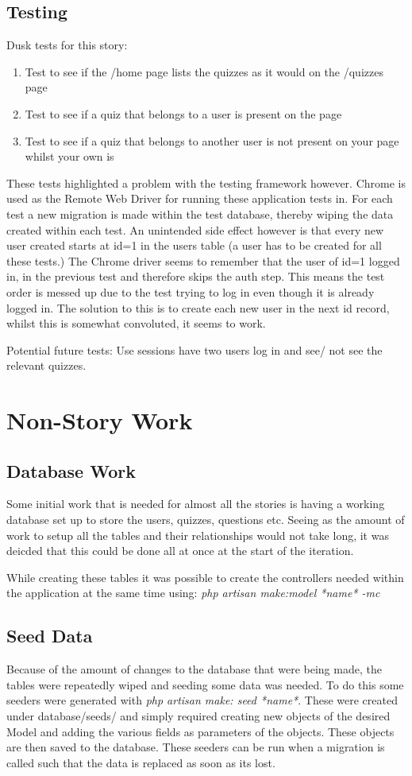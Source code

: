\documentclass{article}
\begin{document}
\subsection{Testing}
Dusk tests for this story:
\begin{enumerate}
	\item Test to see if the /home page lists the quizzes as it would on the /quizzes page
	\item Test to see if a quiz that belongs to a user is present on the page
	\item Test to see if a quiz that belongs to another user is not present on your page whilst your own is
\end{enumerate}
These tests highlighted a problem with the testing framework however. Chrome is used as the Remote Web Driver for running these application tests in. For each test a new migration is made within the test database, thereby wiping the data created within each test. An unintended side effect however is that every new user created starts at id=1 in the users table (a user has to be created for all these tests.) The Chrome driver seems to remember that the user of id=1 logged in, in the previous test and therefore skips the auth step. This means the test order is messed up due to the test trying to log in even though it is already logged in. The solution to this is to create each new user in the next id record, whilst this is somewhat convoluted, it seems to work.

Potential future tests: Use sessions have two users log in and see/ not see the relevant quizzes.
\newpage

\section{Non-Story Work}
\subsection{Database Work}
Some initial work that is needed for almost all the stories is having a working database set up to store the users, quizzes, questions etc. Seeing as the amount of work to setup all the tables and their relationships would not take long, it was deicded that this could be done all at once at the start of the iteration.

While creating these tables it was possible to create the controllers needed within the application at the same time using: \textit{php artisan make:model *name* -mc } 
\subsection{Seed Data}
Because of the amount of changes to the database that were being made, the tables were repeatedly wiped and seeding some data was needed. To do this some seeders were generated with \textit{php artisan make: seed *name*}. These were created under database/seeds/ and simply required creating new objects of the desired Model and adding the various fields as parameters of the objects. These objects are then saved to the database. These seeders can be run when a migration is called such that the data is replaced as soon as its lost.
\end{document}
